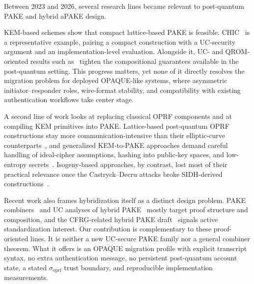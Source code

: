 \documentclass[preprint,12pt]{elsarticle}
\newcommand{\sigoprf}{\sigma_{\mathrm{oprf}}}
\theoremstyle{remark}
\begin{document}
Between 2023 and 2026, several research lines became relevant to
post-quantum PAKE and hybrid aPAKE design.

KEM-based schemes show that compact lattice-based PAKE is feasible.
CHIC~\cite{arriaga2024} is a representative example, pairing a compact
construction with a UC-security argument and an implementation-level
evaluation. Alongside it, UC- and QROM-oriented results such
as~\cite{lyu2024uc} tighten the compositional guarantees available in
the post-quantum setting. This progress matters, yet none of it directly
resolves the migration problem for deployed OPAQUE-like systems, where
asymmetric initiator--responder roles, wire-format stability, and
compatibility with existing authentication workflows take center stage.

A second line of work looks at replacing classical OPRF
components and at compiling KEM primitives into PAKE.
Lattice-based post-quantum OPRF constructions stay
more communication-intensive than their elliptic-curve counterparts~\cite{esgin2024}, and generalized KEM-to-PAKE approaches demand
careful handling of ideal-cipher assumptions, hashing into public-key
spaces, and low-entropy secrets~\cite{arriaga2024}. Isogeny-based
approaches, by contrast, lost most of their practical relevance once the
Castryck--Decru attacks broke SIDH-derived constructions~\cite{castryck2023}.

Recent work also frames hybridization itself as a distinct design
problem. PAKE combiners~\cite{hesse2024} and UC analyses of hybrid
PAKE~\cite{lyu2024hybrid} mostly target proof structure and
composition, and the CFRG-related hybrid PAKE draft~\cite{vos2025}
signals active standardization interest. Our contribution is complementary
to these proof-oriented lines. It is neither a new UC-secure PAKE family nor a
general combiner theorem. What it offers is an OPAQUE migration profile
with explicit transcript syntax, no extra authentication message, no
persistent post-quantum account state, a stated $\sigoprf$ trust
boundary, and reproducible implementation measurements.
\end{document}
